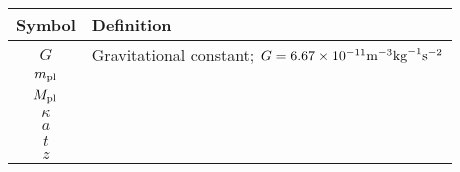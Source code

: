
\begin{tabular}{cl}
\hline\hline
Symbol & Definition \\
\hline
$G$ & Gravitational constant; $G=6.67\times10^{-11}\rm{m}^{-3}\rm{kg}^{-1}\rm{s}^{-2}$ \\
$m_{\text{\scriptsize pl}}$ & \\
$M_{\text{\scriptsize pl}}$ & \\
$\kappa$ & \\
$a$ & \\
$t$ & \\
$z$ & \\
\hline\hline
\end{tabular}